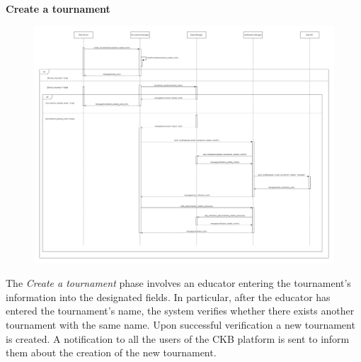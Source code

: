 \documentclass[../DD.tex]{subfiles}
\begin{document}
    \textbf{Create a tournament}\\
    \begin{figure}[H]
        \centering
        \hspace*{-3cm}
        \includegraphics[width=1.35\textwidth]{../assets/section_2/CreateATournamentDiagram.png}
    \end{figure}
    The \textit{Create a tournament} phase involves an educator entering the tournament's information into the designated fields.
    In particular, after the educator has entered the tournament's name, the system verifies whether there exists another tournament with the same name.
    Upon successful verification a new tournament is created.
    A notification to all the users of the CKB platform is sent to inform them about the creation of the new tournament.
    \newpage
\end{document}
